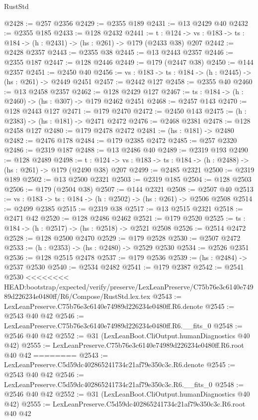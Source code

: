 \begin{lexlean}{RustStd}
\begin{coremodule}
{\begin{coremodule}
{{{{{@2428 := @257 @2356
@2429 := @2355 @189
@2431 := @13 @2429 @40
@2432 := @2355 @185
@2433 := @128 @2432
@2441 := {t : @124} ->
  {vs : @183} -> {ts : @184} -> (h : @2431) -> (hs : @261) -> @179 (@2433 @38) @207
@2442 := @2428 @2357
@2443 := @2355 @38
@2445 := @13 @2443 @2357
@2446 := @2355 @187
@2447 := @128 @2446
@2449 := @179 (@2447 @38)
@2450 := @144 @2357
@2451 := @2450 @40
@2456 := {vs : @183} -> {ts : @184} -> (h : @2445) -> (hs : @261) -> @2449 @2451
@2457 := @2442 @127
@2458 := @2355 @40
@2460 := @13 @2458 @2357
@2462 := @128 @2429 @127
@2467 := {ts : @184} -> (h : @2460) -> (hs : @307) -> @179 @2462 @2451
@2468 := @2457 @143
@2470 := @128 @2443 @127
@2471 := @179 @2470
@2472 := @2450 @143
@2475 := (h : @2383) -> (hs : @181) -> @2471 @2472
@2476 := @2468 @2381
@2478 := @128 @2458 @127
@2480 := @179 @2478 @2472
@2481 := (hs : @181) -> @2480
@2482 := @2476 @178
@2484 := @179 @2385 @2472
@2485 := @257 @2320
@2486 := @2319 @187
@2488 := @13 @2486 @40
@2489 := @2319 @193
@2490 := @128 @2489
@2498 := {t : @124} ->
  {vs : @183} -> {ts : @184} -> (h : @2488) -> (hs : @261) -> @179 (@2490 @38) @207
@2499 := @2485 @2321
@2500 := @2319 @189
@2502 := @13 @2500 @2321
@2503 := @2319 @185
@2504 := @128 @2503
@2506 := @179 (@2504 @38)
@2507 := @144 @2321
@2508 := @2507 @40
@2513 := {vs : @183} -> {ts : @184} -> (h : @2502) -> (hs : @261) -> @2506 @2508
@2514 := @2499 @2385
@2515 := @2319 @38
@2517 := @13 @2515 @2321
@2518 := @2471 @42
@2520 := @128 @2486 @2462
@2521 := @179 @2520
@2525 := {ts : @184} -> (h : @2517) -> (hs : @2518) -> @2521 @2508
@2526 := @2514 @2472
@2528 := @128 @2500 @2470
@2529 := @179 @2528
@2530 := @2507 @2472
@2533 := (h : @2353) -> (hs : @2480) -> @2529 @2530
@2534 := @2526 @2351
@2536 := @128 @2515 @2478
@2537 := @179 @2536
@2539 := (hs : @2484) -> @2537 @2530
@2540 := @2534 @2482
@2541 := @179 @2387
@2542 := @2541 @2530
<<<<<<<< HEAD:bootstrap/expected/verify/preserve/LexLeanPreserve/C75b76e3c6140e74989d226234e0480ff/R6/Compose/RustStd.lex.tex
@2543 := LexLeanPreserve.C75b76e3c6140e74989d226234e0480ff.R6.denote
@2545 := @2543 @40 @42
@2546 := LexLeanPreserve.C75b76e3c6140e74989d226234e0480ff.R6.__fits_0
@2548 := @2546 @40 @42
@2552 := @31 (LexLeanBoot.CliOutput.humanDiagnostics @40 @42)
@2555 := LexLeanPreserve.C75b76e3c6140e74989d226234e0480ff.R6.root @40 @42
========
@2543 := LexLeanPreserve.C5d59dc402865241734c21af79e350c3c.R6.denote
@2545 := @2543 @40 @42
@2546 := LexLeanPreserve.C5d59dc402865241734c21af79e350c3c.R6.__fits_0
@2548 := @2546 @40 @42
@2552 := @31 (LexLeanBoot.CliOutput.humanDiagnostics @40 @42)
@2555 := LexLeanPreserve.C5d59dc402865241734c21af79e350c3c.R6.root @40 @42
}}}}}
\end{coremodule}}
\end{coremodule}
\end{lexlean}
